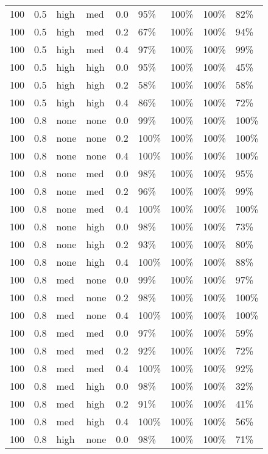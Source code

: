 \begin{longtable}{rrllrllll}
  100 & 0.5 & high & med & 0.0 & 95\% & 100\% & 100\% & 82\% \\ 
  100 & 0.5 & high & med & 0.2 & 67\% & 100\% & 100\% & 94\% \\ 
  100 & 0.5 & high & med & 0.4 & 97\% & 100\% & 100\% & 99\% \\ 
  100 & 0.5 & high & high & 0.0 & 95\% & 100\% & 100\% & 45\% \\ 
  100 & 0.5 & high & high & 0.2 & 58\% & 100\% & 100\% & 58\% \\ 
  100 & 0.5 & high & high & 0.4 & 86\% & 100\% & 100\% & 72\% \\ 
  100 & 0.8 & none & none & 0.0 & 99\% & 100\% & 100\% & 100\% \\ 
  100 & 0.8 & none & none & 0.2 & 100\% & 100\% & 100\% & 100\% \\ 
  100 & 0.8 & none & none & 0.4 & 100\% & 100\% & 100\% & 100\% \\ 
  100 & 0.8 & none & med & 0.0 & 98\% & 100\% & 100\% & 95\% \\ 
  100 & 0.8 & none & med & 0.2 & 96\% & 100\% & 100\% & 99\% \\ 
  100 & 0.8 & none & med & 0.4 & 100\% & 100\% & 100\% & 100\% \\ 
  100 & 0.8 & none & high & 0.0 & 98\% & 100\% & 100\% & 73\% \\ 
  100 & 0.8 & none & high & 0.2 & 93\% & 100\% & 100\% & 80\% \\ 
  100 & 0.8 & none & high & 0.4 & 100\% & 100\% & 100\% & 88\% \\ 
  100 & 0.8 & med & none & 0.0 & 99\% & 100\% & 100\% & 97\% \\ 
  100 & 0.8 & med & none & 0.2 & 98\% & 100\% & 100\% & 100\% \\ 
  100 & 0.8 & med & none & 0.4 & 100\% & 100\% & 100\% & 100\% \\ 
  100 & 0.8 & med & med & 0.0 & 97\% & 100\% & 100\% & 59\% \\ 
  100 & 0.8 & med & med & 0.2 & 92\% & 100\% & 100\% & 72\% \\ 
  100 & 0.8 & med & med & 0.4 & 100\% & 100\% & 100\% & 92\% \\ 
  100 & 0.8 & med & high & 0.0 & 98\% & 100\% & 100\% & 32\% \\ 
  100 & 0.8 & med & high & 0.2 & 91\% & 100\% & 100\% & 41\% \\ 
  100 & 0.8 & med & high & 0.4 & 100\% & 100\% & 100\% & 56\% \\ 
  100 & 0.8 & high & none & 0.0 & 98\% & 100\% & 100\% & 71\% \\ 

\end{longtable}
